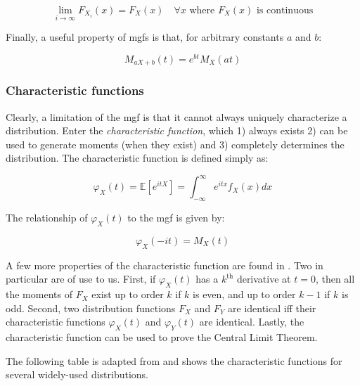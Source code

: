 \documentclass{report}
\begin{document}
\begin{equation}\label{eq:mgf-convergence-2}
    \lim_{i\to\infty} F_{X_i}(x) = F_X(x) \quad \forall x \text{ where } F_X(x) \text{ is continuous}
\end{equation}

Finally, a useful property of \glspl{mgf} is that, for arbitrary constants $a$ and $b$:

\begin{equation}\label{eq:mgf-of-combination}
    M_{aX + b}(t) = e^{bt}M_X(at)
\end{equation}

\subsubsection{Characteristic functions}

Clearly, a limitation of the \gls{mgf} is that it cannot always uniquely characterize a distribution. Enter the \textit{characteristic function}, which 1) always exists 2) can be used to generate moments (when they exist) and 3) completely determines the distribution. The characteristic function is defined simply as:

\begin{equation}\label{eq:characteristic-function-1}
    \varphi_X(t) = \mathbb{E}\left[e^{itX}\right] = \int_{-\infty}^\infty e^{itx} f_X(x) dx
\end{equation}

The relationship of $\varphi_X(t)$ to the \gls{mgf} is given by:

\begin{equation}\label{characteristic-function-2}
    \varphi_X(-it) = M_X(t)
\end{equation}

A few more properties of the characteristic function are found in \cite{oberhettinger_fourier_1973}. Two in particular are of use to us. First, if $\varphi_X(t)$ has a $k^{\text{th}}$ derivative at $t = 0$, then all the moments of $F_X$ exist up to order $k$ if $k$ is even, and up to order $k-1$ if $k$ is odd. Second, two distribution functions $F_X$ and $F_Y$ are identical \gls{iff} their characteristic functions $\varphi_X(t)$ and $\varphi_Y(t)$ are identical. Lastly, the characteristic function can be used to prove the Central Limit Theorem. 

The following table is adapted from \cite{oberhettinger_fourier_1973} and shows the characteristic functions for several widely-used distributions. 
\end{document}
